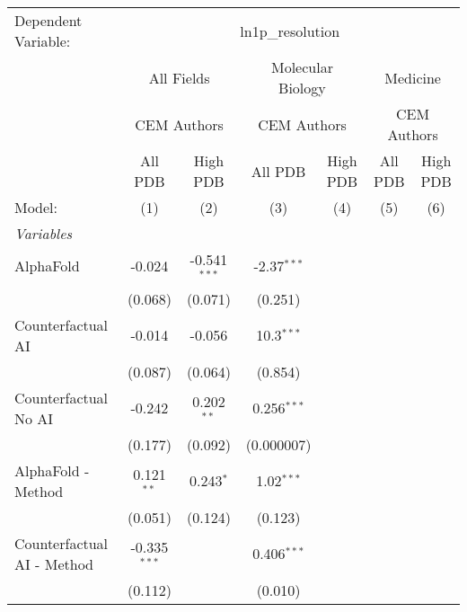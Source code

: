 \begingroup
\centering
\begin{tabular}{lcccccc}
   \tabularnewline \midrule \midrule
   Dependent Variable: & \multicolumn{6}{c}{ln1p\_resolution}\\
 & \multicolumn{2}{c}{All Fields} & \multicolumn{2}{c}{Molecular Biology} & \multicolumn{2}{c}{Medicine} \\
\cmidrule(lr){2-3} \cmidrule(lr){4-5} \cmidrule(lr){6-7}
 & \multicolumn{2}{c}{CEM Authors} & \multicolumn{2}{c}{CEM Authors} & \multicolumn{2}{c}{CEM Authors} \\
\cmidrule(lr){2-3} \cmidrule(lr){4-5} \cmidrule(lr){6-7}
 & \multicolumn{1}{c}{All PDB} & \multicolumn{1}{c}{High PDB} & \multicolumn{1}{c}{All PDB} & \multicolumn{1}{c}{High PDB} & \multicolumn{1}{c}{All PDB} & \multicolumn{1}{c}{High PDB} \\
\cmidrule(lr){2-2} \cmidrule(lr){3-3} \cmidrule(lr){4-4} \cmidrule(lr){5-5} \cmidrule(lr){6-6} \cmidrule(lr){7-7}
   Model:                                & (1)            & (2)            & (3)           & (4) & (5) & (6)\\  
   \midrule
   \emph{Variables}\\
   AlphaFold                             & -0.024         & -0.541$^{***}$ & -2.37$^{***}$ &     &     &   \\   
                                         & (0.068)        & (0.071)        & (0.251)       &     &     &   \\   
   Counterfactual AI                     & -0.014         & -0.056         & 10.3$^{***}$  &     &     &   \\   
                                         & (0.087)        & (0.064)        & (0.854)       &     &     &   \\   
   Counterfactual No AI                  & -0.242         & 0.202$^{**}$   & 0.256$^{***}$ &     &     &   \\   
                                         & (0.177)        & (0.092)        & (0.000007)    &     &     &   \\   
   AlphaFold - Method                    & 0.121$^{**}$   & 0.243$^{*}$    & 1.02$^{***}$  &     &     &   \\   
                                         & (0.051)        & (0.124)        & (0.123)       &     &     &   \\   
   Counterfactual AI - Method            & -0.335$^{***}$ &                & 0.406$^{***}$ &     &     &   \\   
                                         & (0.112)        &                & (0.010)       &     &     &   \\   

\end{tabular}

